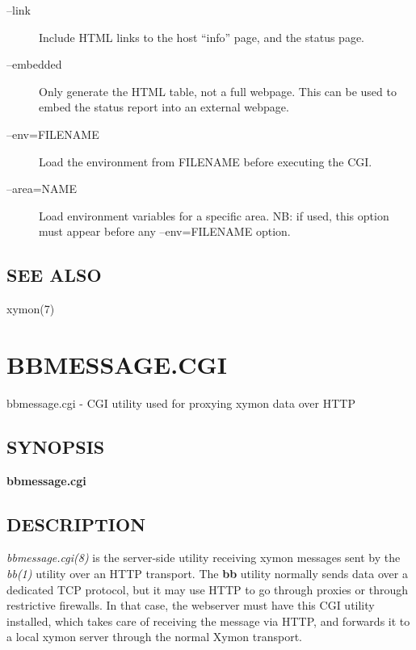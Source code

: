 \begin{description}
 

\item[--link] Include HTML links to the host ``info'' page, and the status page. 

 

\item[--embedded] Only generate the HTML table, not a full
  webpage. This can be used to embed the status report into an
  external webpage. 


 

\item[--env=FILENAME] Load the environment from FILENAME before executing the CGI. 

 

\item[--area=NAME] Load environment variables for a specific area. NB:
  if used, this option must appear before any --env=FILENAME option. 


 


\end{description}
\subsection{SEE ALSO}
xymon(7) 

%
%
\newpage
\section{BBMESSAGE.CGI}

 bbmessage.cgi - CGI utility used for proxying xymon data over HTTP

 \subsection{SYNOPSIS}
\textbf{bbmessage.cgi}


 
\subsection{DESCRIPTION}
\emph{bbmessage.cgi(8)}
 is the server-side utility receiving xymon messages sent by the
 \emph{bb(1)} utility over an HTTP transport. The \textbf{bb} utility
 normally sends data over a dedicated TCP protocol, but it may use
 HTTP to go through proxies or through restrictive firewalls. In that
 case, the webserver must have this CGI utility installed, which takes
 care of receiving the message via HTTP, and forwards it to a local
 xymon server through the normal Xymon transport. 


